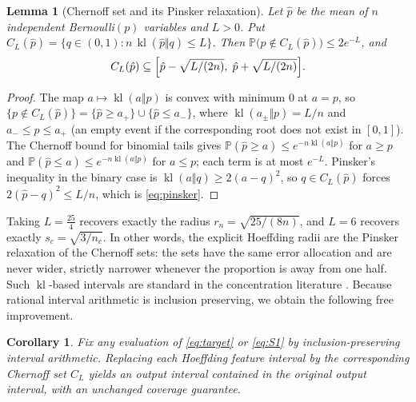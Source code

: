 \documentclass[11pt]{article}
\newtheorem{lemma}[theorem]{Lemma}
\newtheorem{corollary}[theorem]{Corollary}
\theoremstyle{definition}
\newcommand{\Prob}{\mathbb P}
\newcommand{\kl}{\operatorname{kl}}
\begin{document}
\begin{lemma}[Chernoff set and its Pinsker relaxation]\label{lem:chernoff}
Let $\hat p$ be the mean of $n$ independent Bernoulli$(p)$ variables and $L>0$.
Put $C_L(\hat p)=\{q\in(0,1):n\,\kl(\hat p\Vert q)\le L\}$. Then
$\Prob\bigl(p\notin C_L(\hat p)\bigr)\le2e^{-L}$, and
\begin{equation}\label{eq:pinsker}
  C_L(\hat p)\subseteq\Bigl[\hat p-\sqrt{L/(2n)},\;\hat p+\sqrt{L/(2n)}\Bigr].
\end{equation}
\end{lemma}
\begin{proof}
The map $a\mapsto\kl(a\Vert p)$ is convex with minimum $0$ at $a=p$, so
$\{p\notin C_L(\hat p)\}=\{\hat p\ge a_+\}\cup\{\hat p\le a_-\}$, where
$\kl(a_\pm\Vert p)=L/n$ and $a_-\le p\le a_+$ (an empty event if the
corresponding root does not exist in $[0,1]$). The Chernoff bound for binomial
tails \citep{hoeffding1963,boucheron2013} gives
$\Prob(\hat p\ge a)\le e^{-n\kl(a\Vert p)}$ for $a\ge p$ and
$\Prob(\hat p\le a)\le e^{-n\kl(a\Vert p)}$ for $a\le p$; each term is at most
$e^{-L}$. Pinsker's inequality in the binary case is
$\kl(a\Vert q)\ge2(a-q)^2$, so $q\in C_L(\hat p)$ forces
$2(\hat p-q)^2\le L/n$, which is \eqref{eq:pinsker}.
\end{proof}

Taking $L=\tfrac{25}4$ recovers exactly the radius $r_n=\sqrt{25/(8n)}$, and
$L=6$ recovers exactly $s_c=\sqrt{3/n_c}$. In other words, the explicit
Hoeffding radii are the Pinsker relaxation of the Chernoff sets: the sets have
the same error allocation and are never wider, strictly narrower whenever the
proportion is away from one half. Such $\kl$-based intervals are standard in the
concentration literature \citep{garivier2011}. Because rational interval
arithmetic is inclusion preserving, we obtain the following free improvement.

\begin{corollary}\label{cor:never-worse}
Fix any evaluation of \eqref{eq:target} or \eqref{eq:S1} by inclusion-preserving
interval arithmetic. Replacing each Hoeffding feature interval by the
corresponding Chernoff set $C_L$ yields an output interval contained in the
original output interval, with an unchanged coverage guarantee.
\end{corollary}
\end{document}

